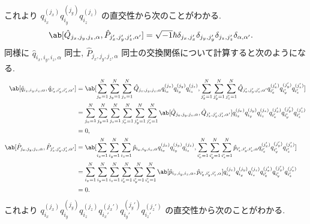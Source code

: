 \documentclass[uplatex,diffipdfmx,a4paper,11pt]{jlreq}
\theoremstyle{definition}
\begin{document}
これより $q_{i_x}^{(j_x)}q_{i_y}^{(j_y)}q_{i_z}^{(j_z)}$ の直交性から次のことがわかる.
\begin{align}
  \ab[\hat{Q}_{j_x,j_y,j_z,\alpha}, \hat{P}_{j_x',j_y',j_z',\alpha'}] & = \sqrt{-1}\hbar\delta_{j_x,j_x'}\delta_{j_y,j_y'}\delta_{j_z,j_z'}\delta_{\alpha,\alpha'}.
\end{align}
同様に $\hat{q}_{i_x,i_y,i_z,\alpha}$ 同士, $\hat{P}_{j_x,j_y,j_z,\alpha}$ 同士の交換関係について計算すると次のようになる.
\begin{align}
  \ab[\hat{q}_{i_x,i_y,i_z,\alpha}, \hat{q}_{i_x',i_y',i_z',\alpha'}] & = \ab[\sum_{j_x=1}^{N}\sum_{j_y=1}^{N}\sum_{j_z=1}^{N}\hat{Q}_{j_x,j_y,j_z,\alpha}q_{i_x}^{(j_x)}q_{i_y}^{(j_y)}q_{i_z}^{(j_z)}, \sum_{j_x'=1}^{N}\sum_{j_y'=1}^{N}\sum_{j_z'=1}^{N}\hat{Q}_{j_x',j_y',j_z',\alpha'}q_{i_x'}^{(j_x')}q_{i_y'}^{(j_y')}q_{i_z'}^{(j_z')}] \\
                                                                      & = \sum_{j_x=1}^{N}\sum_{j_y=1}^{N}\sum_{j_z=1}^{N}\sum_{j_x'=1}^{N}\sum_{j_y'=1}^{N}\sum_{j_z'=1}^{N}\ab[\hat{Q}_{j_x,j_y,j_z,\alpha}, \hat{Q}_{j_x',j_y',j_z',\alpha'}]q_{i_x}^{(j_x)}q_{i_y}^{(j_y)}q_{i_z}^{(j_z)}q_{i_x'}^{(j_x')}q_{i_y'}^{(j_y')}q_{i_z'}^{(j_z')} \\
                                                                      & = 0,                                                                                                                                                                                                                                                                     \\
  \ab[\hat{P}_{j_x,j_y,j_z,\alpha}, \hat{P}_{j_x',j_y',j_z',\alpha'}] & = \ab[\sum_{i_x=1}^{N}\sum_{i_y=1}^{N}\sum_{i_z=1}^{N}\hat{p}_{i_x,i_y,i_z,\alpha}q_{i_x}^{(j_x)}q_{i_y}^{(j_y)}q_{i_z}^{(j_z)}, \sum_{i_x'=1}^{N}\sum_{i_y'=1}^{N}\sum_{i_z'=1}^{N}\hat{p}_{i_x',i_y',i_z',\alpha}q_{i_x'}^{(j_x')}q_{i_y'}^{(j_y')}q_{i_z'}^{(j_z')}]  \\
                                                                      & = \sum_{i_x=1}^{N}\sum_{i_y=1}^{N}\sum_{i_z=1}^{N}\sum_{i_x'=1}^{N}\sum_{i_y'=1}^{N}\sum_{i_z'=1}^{N}\ab[\hat{p}_{i_x,i_y,i_z,\alpha}, \hat{p}_{i_x',i_y',i_z',\alpha}]q_{i_x}^{(j_x)}q_{i_y}^{(j_y)}q_{i_z}^{(j_z)}q_{i_x'}^{(j_x')}q_{i_y'}^{(j_y')}q_{i_z'}^{(j_z')}  \\
                                                                      & = 0.
\end{align}
これより $q_{i_x}^{(j_x)}q_{i_y}^{(j_y)}q_{i_z}^{(j_z)}q_{i_x'}^{(j_x')}q_{i_y'}^{(j_y')}q_{i_z'}^{(j_z')}$ の直交性から次のことがわかる.
\end{document}
